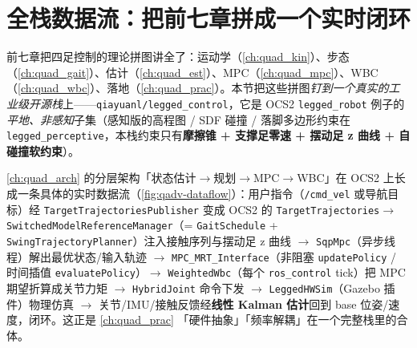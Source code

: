 \section{全栈数据流：把前七章拼成一个实时闭环}
\label{sec:qadv-stack}

前七章把四足控制的理论拼图讲全了：运动学（\cref{ch:quad_kin}）、步态（\cref{ch:quad_gait}）、估计（\cref{ch:quad_est}）、MPC（\cref{ch:quad_mpc}）、WBC（\cref{ch:quad_wbc}）、落地（\cref{ch:quad_prac}）。本节把这些拼图\emph{钉到一个真实的工业级开源栈}上——\texttt{qiayuanl/legged\_control}，它是 OCS2 \texttt{legged\_robot} 例子的\emph{平地、非感知}子集（感知版的高程图 / SDF 碰撞 / 落脚多边形约束在 \texttt{legged\_perceptive}，本栈约束只有\textbf{摩擦锥 + 支撑足零速 + 摆动足 z 曲线 + 自碰撞软约束}）\cite{grandia2022perceptive,liao2023walking}。

\begin{insight}\label{ins:qadv-dataflow}
\cref{ch:quad_arch} 的分层架构「状态估计$\to$规划$\to$MPC$\to$WBC」在 OCS2 上长成一条具体的实时数据流（\cref{fig:qadv-dataflow}）：用户指令（\texttt{/cmd\_vel} 或导航目标）经 \texttt{TargetTrajectoriesPublisher} 变成 OCS2 的 \texttt{TargetTrajectories}$\to$ \texttt{SwitchedModelReferenceManager}（= \texttt{GaitSchedule} + \texttt{SwingTrajectoryPlanner}）注入接触序列与摆动足 z 曲线 $\to$ \texttt{SqpMpc}（异步线程）解出最优状态/输入轨迹 $\to$ \texttt{MPC\_MRT\_Interface}（非阻塞 \texttt{updatePolicy} / 时间插值 \texttt{evaluatePolicy}）$\to$ \texttt{WeightedWbc}（每个 \texttt{ros\_control} tick）把 MPC 期望折算成关节力矩 $\to$ \texttt{HybridJoint} 命令下发 $\to$ \texttt{LeggedHWSim}（Gazebo 插件）物理仿真 $\to$ 关节/IMU/接触反馈经\textbf{线性 Kalman 估计}回到 base 位姿/速度，闭环。这正是 \cref{ch:quad_prac} 「硬件抽象」「频率解耦」在一个完整栈里的合体。
\end{insight}


